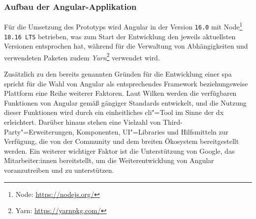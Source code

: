 \documentclass[a4paper,12pt,twoside,numbers=noendperiod]{scrreprt}
\begin{document}
\subsubsection*{Aufbau der Angular-Applikation}
\label{sub-sub-sec:aufbau-angular-applikation}

Für die Umsetzung des Prototyps wird Angular in der Version \texttt{16.0} mit Node\footnote{Node: \url{https://nodejs.org/}} \texttt{18.16 LTS} betrieben, was zum Start der Entwicklung den jeweils aktuellsten Versionen entsprochen hat, während für die Verwaltung von Abhängigkeiten und verwendeten Paketen zudem \textit{Yarn}\footnote{Yarn: \url{https://yarnpkg.com/}} verwendet wird.

\medskip

Zusätzlich zu den bereits genannten Gründen für die Entwicklung einer \acl{spa} spricht für die Wahl von Angular als entsprechendes Framework beziehungsweise Plattform eine Reihe weiterer Faktoren. Laut Wilken werden die verfügbaren Funktionen von Angular gemäß gängiger Standards entwickelt, und die Nutzung dieser Funktionen wird durch ein einheitliches \ac{cli}"=Tool im Sinne der \ac{dx} erleichtert. Darüber hinaus stehen eine Vielzahl von Third-Party"=Erweiterungen, Komponenten, UI"=Libraries und Hilfsmitteln zur Verfügung, die von der Community und dem breiten Ökosystem bereitgestellt werden. Ein weiterer wichtiger Faktor ist die Unterstützung von Google, das Mitarbeiter:innen bereitstellt, um die Weiterentwicklung von Angular voranzutreiben und zu unterstützen. \cite[2]{wilken_angular_2018}

\medskip
\end{document}
